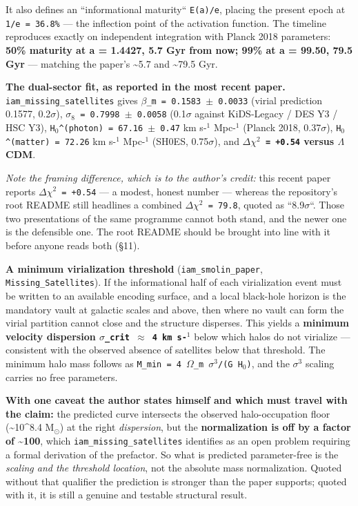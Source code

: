 \documentclass[12pt,a4paper]{article}
\begin{document}
It also defines an ``informational maturity`` \texttt{E(a)/e}, placing the present epoch at \texttt{1/e = 36.8\%} --- the inflection point of the activation function. The timeline reproduces exactly on independent integration with Planck 2018 parameters: \textbf{50\% maturity at a = 1.4427, 5.7 Gyr from now; 99\% at a = 99.50, 79.5 Gyr} --- matching the paper's \textasciitilde{}5.7 and \textasciitilde{}79.5 Gyr.


\textbf{The dual-sector fit, as reported in the most recent paper.} \texttt{iam\_missing\_satellites} gives \texttt{$\beta$\_m = 0.1583 $\pm$ 0.0033} (virial prediction 0.1577, 0.2$\sigma$), \texttt{$\sigma_{8}$ = 0.7998 $\pm$ 0.0058} (0.1$\sigma$ against KiDS-Legacy / DES Y3 / HSC Y3), \texttt{H$_{0}$\textasciicircum{}(photon) = 67.16 $\pm$ 0.47} km s-$^{1}$ Mpc-$^{1}$ (Planck 2018, 0.37$\sigma$), \texttt{H$_{0}$\textasciicircum{}(matter) = 72.26} km s-$^{1}$ Mpc-$^{1}$ (SH0ES, 0.75$\sigma$), and \textbf{\texttt{$\Delta\chi^{2}$ = +0.54} versus $\Lambda$CDM}.


\textit{Note the framing difference, which is to the author's credit:} this recent paper reports \texttt{$\Delta\chi^{2}$ = +0.54} --- a modest, honest number --- whereas the repository's root README still headlines a combined \texttt{$\Delta\chi^{2}$ = 79.8}, quoted as ``8.9$\sigma$``. Those two presentations of the same programme cannot both stand, and the newer one is the defensible one. The root README should be brought into line with it before anyone reads both (\S11).


\textbf{A minimum virialization threshold} (\texttt{iam\_smolin\_paper}, \texttt{Missing\_Satellites}). If the informational half of each virialization event must be written to an available encoding surface, and a local black-hole horizon is the mandatory vault at galactic scales and above, then where no vault can form the virial partition cannot close and the structure disperses. This yields a \textbf{minimum velocity dispersion \texttt{$\sigma$\_crit $\approx$ 4 km s-$^{1}$}} below which halos do not virialize --- consistent with the observed absence of satellites below that threshold. The minimum halo mass follows as \texttt{M\_min = 4 $\Omega$\_m $\sigma^{3}$/(G H$_{0}$)}, and the \texttt{$\sigma^{3}$} scaling carries no free parameters.


\textbf{With one caveat the author states himself and which must travel with the claim:} the predicted curve intersects the observed halo-occupation floor (\textasciitilde{}10\textasciicircum{}8.4 M$_{\odot}$) at the right \textit{dispersion}, but the \textbf{normalization is off by a factor of \textasciitilde{}100}, which \texttt{iam\_missing\_satellites} identifies as an open problem requiring a formal derivation of the prefactor. So what is predicted parameter-free is the \textit{scaling and the threshold location}, not the absolute mass normalization. Quoted without that qualifier the prediction is stronger than the paper supports; quoted with it, it is still a genuine and testable structural result.
\end{document}
